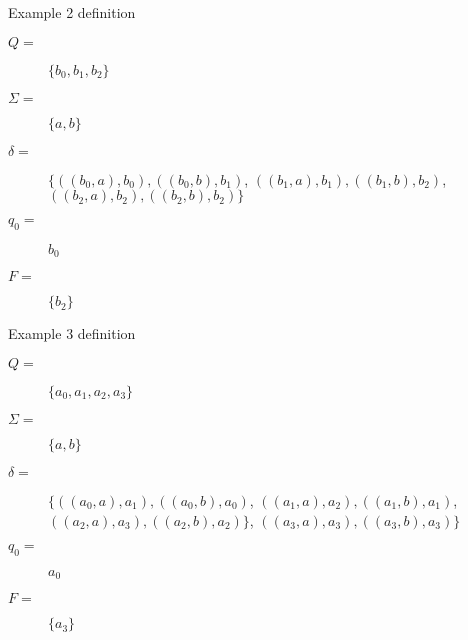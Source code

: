 \begin{frame}[fragile]{Example 2 definition}
  \begin{description}
    \item[$Q =$] $\{ b_0, b_1, b_2\}$
    \item[$\Sigma =$] $\{ a, b \}$
    \item[$\delta =$] $\{ ((b_0,a),b_0), ((b_0,b),b_1)$, $((b_1,a),b_1), ((b_1,b),b_2)$, $((b_2,a),b_2), ((b_2,b),b_2) \}$
    \item[$q_0 =$] $b_0$
    \item[$F =$] $\{ b_2 \}$
  \end{description}
\end{frame}

\begin{frame}[fragile]{Example 3 definition}
  \begin{description}
    \item[$Q =$] $\{ a_0, a_1, a_2, a_3 \}$
    \item[$\Sigma =$] $\{ a, b \}$
    \item[$\delta =$] $\{ ((a_0,a),a_1), ((a_0,b),a_0)$, $((a_1,a),a_2), ((a_1,b),a_1)$, $((a_2,a),a_3), ((a_2,b),a_2) \}$, $((a_3,a),a_3), ((a_3,b),a_3) \}$
    \item[$q_0 =$] $a_0$
    \item[$F =$] $\{ a_3 \}$
  \end{description}
\end{frame}